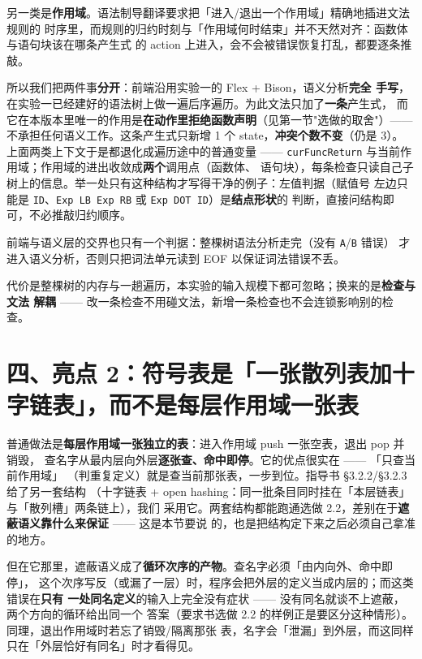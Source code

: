 \documentclass[11pt,a4paper]{ctexart}
\newcommand{\code}[1]{\texttt{#1}}
\begin{document}
另一类是\textbf{作用域}。语法制导翻译要求把「进入/退出一个作用域」精确地插进文法规则的
时序里，而规则的归约时刻与「作用域何时结束」并不天然对齐：函数体与语句块该在哪条产生式
的 action 上进入，会不会被错误恢复打乱，都要逐条推敲。

所以我们把两件事\textbf{分开}：前端沿用实验一的 Flex + Bison，语义分析\textbf{完全
手写}，在实验一已经建好的语法树上做一遍后序遍历。为此文法只加了\textbf{一条}产生式，
而它在本版本里唯一的作用是\textbf{在动作里拒绝函数声明}（见第一节"选做的取舍"）——
不承担任何语义工作。这条产生式只新增 1 个 state，\textbf{冲突个数不变}（仍是 3）。
上面两类上下文于是都退化成遍历途中的普通变量 ——
\code{curFuncReturn} 与当前作用域；作用域的进出收敛成\textbf{两个}调用点（函数体、
语句块），每条检查只读自己子树上的信息。举一处只有这种结构才写得干净的例子：左值判据（赋值号
左边只能是 \code{ID}、\code{Exp LB Exp RB} 或 \code{Exp DOT ID}）是\textbf{结点形状}的
判断，直接问结构即可，不必推敲归约顺序。

前端与语义层的交界也只有一个判据：整棵树语法分析走完（没有 \code{A}/\code{B} 错误）
才进入语义分析，否则只把词法单元读到 EOF 以保证词法错误不丢。

代价是整棵树的内存与一趟遍历，本实验的输入规模下都可忽略；换来的是\textbf{检查与文法
解耦} —— 改一条检查不用碰文法，新增一条检查也不会连锁影响别的检查。

\section*{四、亮点 2：符号表是「一张散列表加十字链表」，而不是每层作用域一张表}

普通做法是\textbf{每层作用域一张独立的表}：进入作用域 push 一张空表，退出 pop 并销毁，
查名字从最内层向外层\textbf{逐张查、命中即停}。它的优点很实在 —— 「只查当前作用域」
（判重复定义）就是查当前那张表，一步到位。指导书 §3.2.2/§3.2.3 给了另一套结构
（十字链表 + open hashing：同一批条目同时挂在「本层链表」与「散列槽」两条链上），我们
采用它。两套结构都能跑通选做 2.2，差别在于\textbf{遮蔽语义靠什么来保证} —— 这是本节要说
的，也是把结构定下来之后必须自己拿准的地方。

但在它那里，遮蔽语义成了\textbf{循环次序的产物}。查名字必须「由内向外、命中即停」，
这个次序写反（或漏了一层）时，程序会把外层的定义当成内层的；而这类错误在\textbf{只有
一处同名定义}的输入上完全没有症状 —— 没有同名就谈不上遮蔽，两个方向的循环给出同一个
答案（要求书选做 2.2 的样例正是要区分这种情形）。同理，退出作用域时若忘了销毁/隔离那张
表，名字会「泄漏」到外层，而这同样只在「外层恰好有同名」时才看得见。
\end{document}
